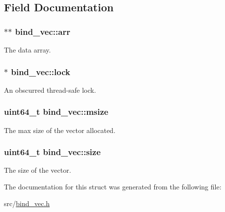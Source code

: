 \subsection{Field Documentation}
\subsubsection[{\texorpdfstring{arr}{arr}}]{$\ast$$\ast$ bind\+\_\+vec\+::arr}\hypertarget{structbind__vec_a8bf39e88ad9a1715c7e6cfa4fa8028f4}{}\label{structbind__vec_a8bf39e88ad9a1715c7e6cfa4fa8028f4}


The data array. 

\subsubsection[{\texorpdfstring{lock}{lock}}]{$\ast$ bind\+\_\+vec\+::lock}\hypertarget{structbind__vec_af6053d8f0d9be5d8b03ffbc06f30c0a5}{}\label{structbind__vec_af6053d8f0d9be5d8b03ffbc06f30c0a5}


An obscurred thread-\/safe lock. 

\subsubsection[{\texorpdfstring{msize}{msize}}]{\setlength{\rightskip}{0pt plus 5cm}uint64\+\_\+t bind\+\_\+vec\+::msize}\hypertarget{structbind__vec_aa45fa0f2e32261123f693541f26fc12b}{}\label{structbind__vec_aa45fa0f2e32261123f693541f26fc12b}


The max size of the vector allocated. 

\subsubsection[{\texorpdfstring{size}{size}}]{\setlength{\rightskip}{0pt plus 5cm}uint64\+\_\+t bind\+\_\+vec\+::size}\hypertarget{structbind__vec_a322fa9fd253719971508bf013a668a64}{}\label{structbind__vec_a322fa9fd253719971508bf013a668a64}


The size of the vector. 



The documentation for this struct was generated from the following file\+:\begin{DoxyCompactItemize}
\item 
src/\hyperlink{bind__vec_8h}{bind\+\_\+vec.\+h}\end{DoxyCompactItemize}
